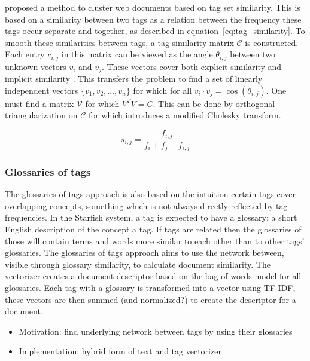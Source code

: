 \citet{zhou2011web} proposed a method to cluster web documents based on tag set similarity. This is based on a similarity between two tags as a relation between the frequency these tags occur separate and together, as described in equation~\ref{eq:tag_similarity}. To smooth these similarities between tags, a tag similarity matrix $\mathcal{C}$ is constructed. Each entry $c_{i,j}$ in this matrix can be viewed as the angle $\theta_{i,j}$ between two unknown vectors $v_i$ and $v_j$. These vectors cover both explicit similarity and implicit similarity \citep{park2010vector}. This transfers the problem to find a set of linearly independent vectors $\{v_1,v_2,\ldots,v_n\}$ for which for all $v_i \cdot v_j = \cos(\theta_{i,j})$. One must find a matrix $\mathcal{V}$ for which $V^TV = C$. This can be done by orthogonal triangularization on $\mathcal{C}$ for which \citeauthor{zhou2011web} introduces a modified Cholesky transform.

\begin{equation} \label{eq:tag_similarity}
s_{i,j} = \frac{f_{i,j}}{f_i + f_j - f_{i,j}}
\end{equation}


\subsubsection{Glossaries of tags}
The glossaries of tags approach is also based on the intuition certain tags cover overlapping concepts, something which is not always directly reflected by tag frequencies. In the Starfish system, a tag is expected to have a glossary; a short English description of the concept a tag. If tags are related then the glossaries of those will contain terms and words more similar to each other than to other tags' glossaries. The glossaries of tags approach aims to use the network between, visible through glossary similarity, to calculate document similarity.
The vectorizer creates a document descriptor based on the bag of words model for all glossaries. Each tag with a glossary is transformed into a vector using TF-IDF, these vectors are then summed (and normalized?) to create the descriptor for a document.

\begin{itemize}
\item Motivation: find underlying network between tags by using their glossaries
\item Implementation: hybrid form of text and tag vectorizer
\end{itemize}


